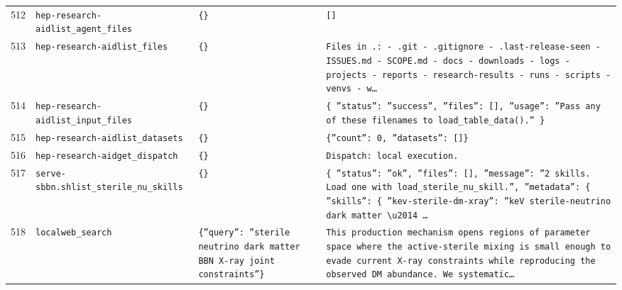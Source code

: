 \documentclass[11pt,a4paper]{article}
\begin{document}
\begin{longtable}{@{}p{}p{}p{}p{}@{}}
512 & \texttt{hep-research-aid}\newline\texttt{list\_\allowbreak{}agent\_\allowbreak{}files} & \texttt{\{\}\allowbreak{}} & \texttt{[]\allowbreak{}} \\
513 & \texttt{hep-research-aid}\newline\texttt{list\_\allowbreak{}files} & \texttt{\{\}\allowbreak{}} & \texttt{Files in .:\allowbreak{}   - .git   - .gitignore   - .last-release-seen   - ISSUES.md   - SCOPE.md   - docs   - downloads   - logs   - projects   - reports   - research-results   - runs   - scripts   - venvs   - w\ldots{}\allowbreak{}} \\
514 & \texttt{hep-research-aid}\newline\texttt{list\_\allowbreak{}input\_\allowbreak{}files} & \texttt{\{\}\allowbreak{}} & \texttt{\{   ''status'':\allowbreak{} ''success'',\allowbreak{}   ''files'':\allowbreak{} []\allowbreak{},\allowbreak{}   ''usage'':\allowbreak{} ''Pass any of these filenames to load\_\allowbreak{}table\_\allowbreak{}data()\allowbreak{}.'' \}\allowbreak{}} \\
515 & \texttt{hep-research-aid}\newline\texttt{list\_\allowbreak{}datasets} & \texttt{\{\}\allowbreak{}} & \texttt{\{''count'':\allowbreak{} 0,\allowbreak{} ''datasets'':\allowbreak{} []\allowbreak{}\}\allowbreak{}} \\
516 & \texttt{hep-research-aid}\newline\texttt{get\_\allowbreak{}dispatch} & \texttt{\{\}\allowbreak{}} & \texttt{Dispatch:\allowbreak{} local execution.} \\
517 & \texttt{serve-sbbn.sh}\newline\texttt{list\_\allowbreak{}sterile\_\allowbreak{}nu\_\allowbreak{}skills} & \texttt{\{\}\allowbreak{}} & \texttt{\{   ''status'':\allowbreak{} ''ok'',\allowbreak{}   ''files'':\allowbreak{} []\allowbreak{},\allowbreak{}   ''message'':\allowbreak{} ''2 skills. Load one with load\_\allowbreak{}sterile\_\allowbreak{}nu\_\allowbreak{}skill.'',\allowbreak{}   ''metadata'':\allowbreak{} \{     ''skills'':\allowbreak{} \{       ''kev-sterile-dm-xray'':\allowbreak{} ''keV sterile-neutrino dark matter \textbackslash{}\allowbreak{}u2014 \ldots{}\allowbreak{}} \\
518 & \texttt{local}\newline\texttt{web\_\allowbreak{}search} & \texttt{\{''query'':\allowbreak{} ''sterile neutrino dark matter BBN X-ray joint constraints''\}\allowbreak{}} & \texttt{This production mechanism opens regions of parameter space where the active-sterile mixing is small enough to evade current X-ray constraints while reproducing the observed DM abundance. We systematic\ldots{}\allowbreak{}} \\

\end{longtable}
\end{document}
